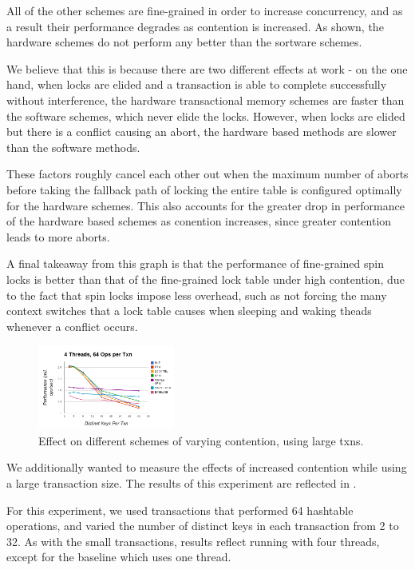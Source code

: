 All of the other schemes are fine-grained in order to increase concurrency, 
and as a result their performance degrades as contention is increased. As 
shown, the hardware schemes do not perform any better than the sortware 
schemes.

We believe that this is because there are two different effects at 
work - on the one hand, when locks are elided and a transaction is able to 
complete successfully without interference, the hardware transactional memory 
schemes are faster than the software schemes, which never elide the locks. 
However, when locks are elided but there is a conflict causing an abort, 
the hardware based methods are slower than the software methods.

These factors roughly cancel each other out when the maximum number of aborts 
before taking the fallback path of locking the entire table is configured 
optimally for the hardware schemes. This also accounts for the greater drop in 
performance of the hardware based schemes as conention increases, since greater 
contention leads to more aborts.

A final takeaway from this graph is that the performance of fine-grained spin 
locks is better than that of the fine-grained lock table under high contention, 
due to the fact that spin locks impose less overhead, such as not forcing the 
many context switches that a lock table causes when sleeping and waking theads 
whenever a conflict occurs.

\begin{figure}[h!]
  \centering
  \includegraphics[width=0.4\textwidth]{figure/large_txns.png}
  \caption{Effect on different schemes of varying contention, using large txns.}
  \label{fig:large_txns} 
\end{figure}

We additionally wanted to measure the effects of increased contention while 
using a large transaction size. The results of this experiment are reflected 
in .

For this experiment, we used transactions that performed 64 hashtable operations, 
and varied the number of distinct keys in each transaction from 2 to 32. As with 
the small transactions, results reflect running with four threads, except for 
the baseline which uses one thread.

